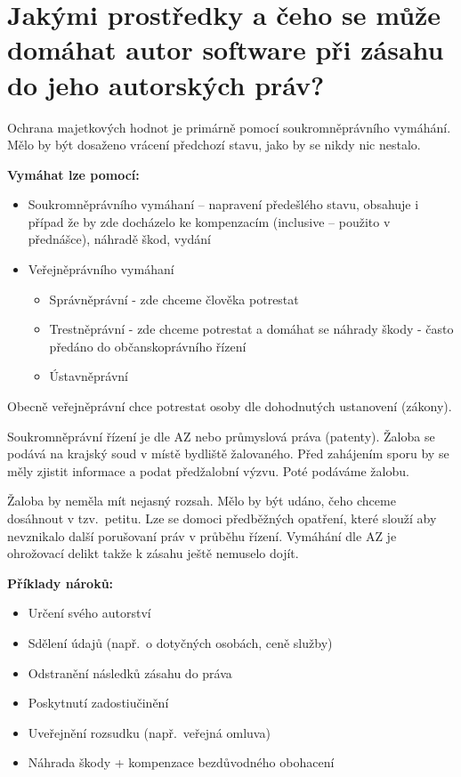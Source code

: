\section{Jakými prostředky a čeho se může domáhat autor software při zásahu do jeho autorských práv?}

Ochrana majetkových hodnot je primárně pomocí soukromněprávního vymáhání. Mělo by být dosaženo vrácení předchozí stavu, jako by se nikdy nic nestalo.
\newline

\noindent\textbf{Vymáhat lze pomocí:}
\begin{itemize}[noitemsep]
    \item Soukromněprávního vymáhaní -- napravení předešlého stavu, obsahuje i případ že by zde docházelo ke kompenzacím (inclusive -- použito v přednášce), náhradě škod, vydání
    \item Veřejněprávního vymáhaní
    \begin{itemize}[noitemsep]
        \item Správněprávní - zde chceme člověka potrestat 
        \item Trestněprávní - zde chceme potrestat a domáhat se náhrady škody - často předáno do občanskoprávního řízení
        \item Ústavněprávní
    \end{itemize}
\end{itemize}

\noindent Obecně veřejněprávní chce potrestat osoby dle dohodnutých ustanovení (zákony).

Soukromněprávní řízení je dle AZ nebo průmyslová práva (patenty). Žaloba se podává na krajský soud v místě bydliště žalovaného. Před zahájením sporu by se měly zjistit informace a podat předžalobní výzvu. Poté podáváme žalobu. 

Žaloba by neměla mít nejasný rozsah. Mělo by být udáno, čeho chceme dosáhnout v tzv.\ petitu. Lze se domoci předběžných opatření, které slouží aby nevznikalo další porušovaní práv v průběhu řízení. Vymáhání dle AZ je ohrožovací delikt takže k zásahu ještě nemuselo dojít. 
\newline

\noindent\textbf{Příklady nároků:}
\begin{itemize}[noitemsep]
    \item Určení svého autorství
    \item Sdělení údajů (např.\ o dotyčných osobách, ceně služby)
    \item Odstranění následků zásahu do práva
    \item Poskytnutí zadostiučinění
    \item Uveřejnění rozsudku (např.\ veřejná omluva)
    \item Náhrada škody + kompenzace bezdůvodného obohacení
\end{itemize}

